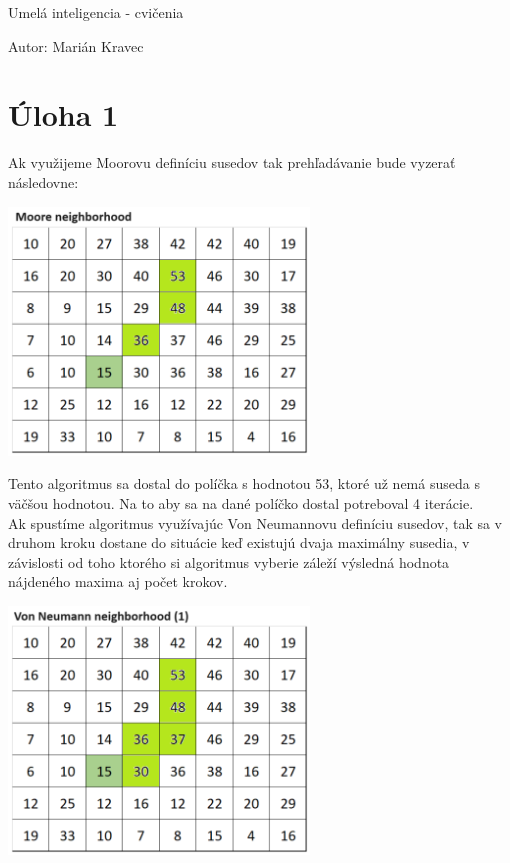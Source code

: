 \documentclass[a4paper]{article}
\begin{document}
 
	
\pagestyle{plain}

\begin{center}
	\sc\large
	Umelá inteligencia - cvičenia
\end{center}

Autor: Marián Kravec

\section{Úloha 1}

Ak využijeme Moorovu definíciu susedov tak prehľadávanie bude vyzerať následovne:

\centerline{\includegraphics[width=0.6\textwidth]{moore}}

Tento algoritmus sa dostal do políčka s hodnotou 53, ktoré už nemá suseda s väčšou hodnotou. Na to aby sa na dané políčko dostal potreboval 4 iterácie.
\\

Ak spustíme algoritmus využívajúc Von Neumannovu definíciu susedov, tak sa v druhom kroku dostane do situácie keď existujú dvaja maximálny susedia, v závislosti od toho ktorého si algoritmus vyberie záleží výsledná hodnota nájdeného maxima aj počet krokov. 

\centerline{\includegraphics[width=0.6\textwidth]{von_1}}
\end{document}
